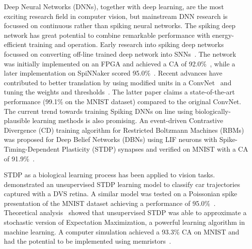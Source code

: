 \documentclass{frontiersENG} %
\begin{document}
Deep Neural Networks (DNNs), together with deep learning, are the most exciting research field in computer vision, but mainstream DNN research is focussed on continuous rather than spiking neural networks.
The spiking deep network has great potential to combine remarkable performance with energy-efficient training and operation.
Early research into spiking deep networks focussed on converting off-line trained deep network into SNNs~\citep{o2013real}.
The network was initially implemented on an FPGA and achieved a CA of 92.0\%~\citep{neil2014minitaur}, while a later implementation on SpiNNaker scored 95.0\%~\citep{Stromatias2015scalable}.
Recent advances have contributed to better translation by using modified units in a ConvNet~\citep{cao2015spiking} and tuning the weights and thresholds~\citep{Diehl2015fast}.
The latter paper claims a state-of-the-art performance (99.1\% on the MNIST dataset) compared to the original ConvNet.
The current trend towards training Spiking DNNs on line using biologically-plausible learning methods is also promising.
An event-driven Contrastive Divergence (CD) training algorithm for Restricted Boltzmann Machines (RBMs) was proposed for Deep Belief Networks (DBNs) using LIF neurons with Spike-Timing-Dependent Plasticity (STDP) synapses and verified on MNIST with a CA of 91.9\%~\citep{neftci2013event}.

STDP as a biological learning process has been applied to vision tasks.
\cite{bichler2012extraction} demonstrated an unsupervised STDP learning model to classify car trajectories captured with a DVS retina. 
A similar model was tested on a Poissonian spike presentation of the MNIST dataset achieving a performance of 95.0\%~\citep{diehl2015unsupervised}.
Theoretical analysis~\citep{nessler2013bayesian} showed that unsupervised STDP was able to approximate a stochastic version of Expectation Maximization, a powerful learning algorithm in machine learning.
A computer simulation achieved a 93.3\% CA on MNIST and had the potential to be implemented using memristors~\citep{bill2014compound}. 
\end{document}
